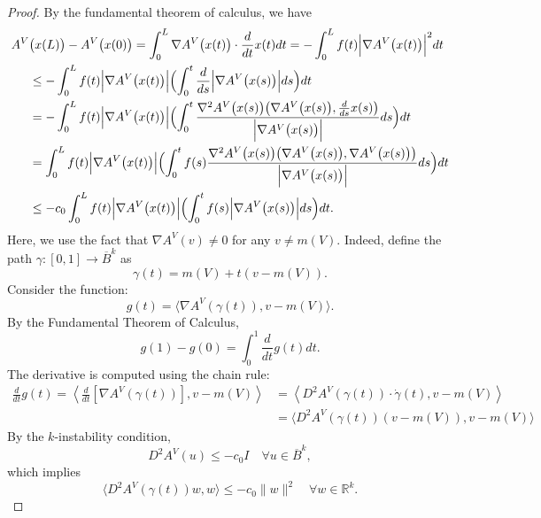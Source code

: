 \documentclass[12pt,english]{article}
\theoremstyle{definition}
\begin{document}
\begin{proof}
By the fundamental theorem of calculus, we have
\begin{align*}
    A^V&\bigl(x(L)\bigr) - A^V\bigl(x(0)\bigr) = \int_0^L \nabla A^V\bigl(x(t)\bigr) \cdot \frac{d}{dt} x(t) dt = - \int_0^L f(t) \Bigl|\nabla A^V\bigl(x(t)\bigr)\Bigr|^2dt \\
    &\leq - \int_0^L f(t) \Bigl|\nabla A^V\bigl(x(t)\bigr)\Bigr| \Bigl(\int_0^t \frac{d}{ds}\Bigl|\nabla A^V\bigl(x(s)\bigr)\Bigr| ds \Bigr)dt \\
    &= - \int_0^L f(t) \Bigl|\nabla A^V\bigl(x(t)\bigr)\Bigr| \Bigl(\int_0^t \frac{\nabla^2 A^V\bigl(x(s)\bigr)\bigl(\nabla A^V\bigl(x(s)\bigr), \frac{d}{ds}x(s)\bigr)}{\Bigl|\nabla A^V\bigl(x(s)\bigr)\Bigr|} ds \Bigr)dt \\
    &= \int_0^L f(t) \Bigl|\nabla A^V\bigl(x(t)\bigr)\Bigr| \Bigl(\int_0^t f(s) \frac{\nabla^2 A^V\bigl(x(s)\bigr)\bigl(\nabla A^V\bigl(x(s)\bigr), \nabla A^V\bigl(x(s)\bigr)\bigr)}{\Bigl|\nabla A^V\bigl(x(s)\bigr)\Bigr|} ds \Bigr)dt \\
    &\leq - c_0 \int_0^L f(t) \Bigl|\nabla A^V\bigl(x(t)\bigr)\Bigr| \Bigl(\int_0^t f(s) \Bigl|\nabla A^V\bigl(x(s)\bigr)\Bigr| ds \Bigr)dt.
\end{align*}
Here, we use the fact that $\nabla A^V(v) \neq 0$ for any $v \neq m(V)$. Indeed, define the path $\gamma: [0,1] \to \overline{B}^{k}$ as
\begin{equation*}
    \gamma(t) = m(V) + t(v - m(V)).
\end{equation*}
Consider the function:
\begin{equation*}
g(t) = \langle \nabla A^V(\gamma(t)), v - m(V) \rangle.
\end{equation*}
By the Fundamental Theorem of Calculus,
\begin{equation*}
g(1) - g(0) = \int_0^1 \frac{d}{dt} g(t)  dt.
\end{equation*}
The derivative is computed using the chain rule:
\begin{align*}
\frac{d}{dt} g(t) 
= \left\langle \frac{d}{dt} \left[ \nabla A^V(\gamma(t)) \right], v - m(V) \right\rangle &= \left\langle D^2 A^V(\gamma(t)) \cdot \dot{\gamma}(t), v - m(V) \right\rangle \\
&= \langle D^2 A^V(\gamma(t)) (v - m(V)), v - m(V) \rangle
\end{align*}
By the $k$-instability condition,
\[
D^2 A^V(u) \leq -c_0 I \quad \forall u \in \overline{B}^k,
\]
which implies
\[
\langle D^2 A^V(\gamma(t)) w, w \rangle \leq -c_0 \lVert w \rVert^2 \quad \forall w \in \mathbb{R}^{k}.
\]
\end{proof}
\end{document}
